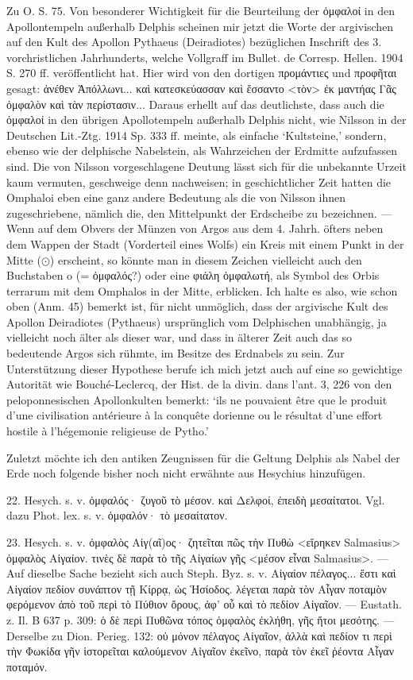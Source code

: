 \documentclass[a4paper, 11pt, oneside]{article}
\begin{document}
Zu O. S. 75. Von besonderer Wichtigkeit für die Beurteilung der ὀμφαλοί in den Apollontempeln außerhalb Delphis scheinen mir jetzt die Worte der argivischen auf den Kult des Apollon Pythaeus (Deiradiotes) bezüglichen Inschrift des 3. vorchristlichen Jahrhunderts, welche Vollgraff im Bullet. de Corresp. Hellen. 1904 S. 270 ff. veröffentlicht hat. Hier wird von den dortigen προμάντιες und προφῆται gesagt: ἀνέθεν Ἀπόλλωνι... καὶ κατεσκεύασσαν καὶ ἔσσαντο <τὸν> ἐκ μαντήας Γᾶς ὀμφαλὸν καὶ τὰν περίστασιν... Daraus erhellt auf das deutlichste, dass auch die ὀμφαλοί in den übrigen Apollotempeln außerhalb Delphis nicht, wie Nilsson in der Deutschen Lit.-Ztg. 1914 Sp. 333 ff. meinte, als einfache `Kultsteine,' sondern, ebenso wie der delphische Nabelstein, als Wahrzeichen der Erdmitte aufzufassen sind. Die von Nilsson vorgeschlagene Deutung lässt sich für die unbekannte Urzeit kaum vermuten, geschweige denn nachweisen; in geschichtlicher Zeit hatten die Omphaloi eben eine ganz andere Bedeutung als die von Nilsson ihnen zugeschriebene, nämlich die, den Mittelpunkt der Erdscheibe zu bezeichnen. --- Wenn auf dem Obvers der Münzen von Argos aus dem 4. Jahrh. öfters neben dem Wappen der Stadt (Vorderteil eines Wolfs) ein Kreis mit einem Punkt in der Mitte ($\odot$) erscheint, so könnte man in diesem Zeichen vielleicht auch den Buchstaben o (= ὀμφαλός?) oder eine φιάλη ὀμφαλωτή, als Symbol des Orbis terrarum mit dem Omphalos in der Mitte, erblicken. Ich halte es also, wie schon oben (Anm. 45) bemerkt ist, für nicht unmöglich, dass der argivische Kult des Apollon Deiradiotes (Pythaeus) ursprünglich vom Delphischen unabhängig, ja vielleicht noch älter als dieser war, und dass in älterer Zeit auch das so bedeutende Argos sich rühmte, im Besitze des Erdnabels zu sein. Zur Unterstützung dieser Hypothese berufe ich mich jetzt auch auf eine so gewichtige Autorität wie Bouché-Leclercq, der Hist. de la divin. dans l'ant. 3, 226 von den peloponnesischen Apollonkulten bemerkt: `ils ne pouvaient être que le produit d'une civilisation antérieure à la conquête dorienne ou le résultat d'une effort hostile à l'hégemonie religieuse de Pytho.'

Zuletzt möchte ich den antiken Zeugnissen für die Geltung Delphis als Nabel der Erde noch folgende bisher noch nicht erwähnte aus Hesychius hinzufügen.

22. Hesych. s. v. ὀμφαλός· ζυγοῦ τὸ μέσον. καὶ Δελφοί, ἐπειδὴ μεσαίτατοι. Vgl. dazu Phot. lex. s. v. ὀμφαλόν· τὸ μεσαίτατον.

23. Hesych. s. v. ὀμφαλὸς Αἰγ(αῖ)ος· ζητεῖται πῶς τὴν Πυθὼ <εἵρηκεν Salmasius> ὀμφαλὸς Αἰγαίον. τινὲς δὲ παρὰ τὸ τῆς Αἰγαίων γῆς <μέσον εἶναι Salmasius>. --- Auf dieselbe Sache bezieht sich auch Steph. Byz. s. v. Αἰγαίον πέλαγος... ἔστι καὶ Αἰγαίον πεδίον συνάπτον τῇ Κίρρᾳ, ὡς Ἡσίοδος. λέγεται παρὰ τὸν Αἶγαν ποταμὸν φερόμενον ἀπὸ τοῦ περὶ τὸ Πύθιον ὄρους, ἀφ' οὗ καὶ τὸ πεδίον Αἰγαῖον. --- Eustath. z. Il. B 637 p. 309: ὁ δὲ περὶ Πυθῶνα τόπος ὀμφαλὸς ἐκλήθη, γῆς ἤτοι μεσότης. --- Derselbe zu Dion. Perieg. 132: οὐ μόνον πέλαγος Αἰγαῖον, ἀλλὰ καὶ πεδίον τι περὶ τὴν Φωκίδα γῆν ἱστορεῖται καλούμενον Αἰγαῖον ἐκεῖνο, παρὰ τὸν ἐκεῖ ῥέοντα Αἶγαν ποταμόν.
\end{document}
